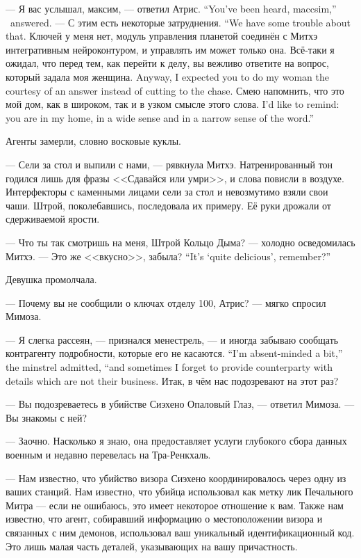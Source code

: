 {--- Я вас услышал, максим, --- ответил Атрис.}
{``You've been heard, maccsim,'' \Aatris\ answered.}
{--- С этим есть некоторые затруднения.}
{``We have some trouble about that.}
Ключей у меня нет, модуль управления планетой соединён с Митхэ интегративным нейроконтуром, и управлять им может только она.
{Всё-таки я ожидал, что перед тем, как перейти к делу, вы вежливо ответите на вопрос, который задала моя женщина.}
{Anyway, I expected you to do my woman the courtesy of an answer instead of cutting to the chase.}
{Смею напомнить, что это мой дом, как в широком, так и в узком смысле этого слова.}
{I'd like to remind: you are in my home, in a wide sense and in a narrow sense of the word.''}

Агенты замерли, словно восковые куклы.

--- Сели за стол и выпили с нами, --- рявкнула Митхэ.
Натренированный тон годился лишь для фразы <<Сдавайся или умри>>, и слова повисли в воздухе.
Интерфекторы с каменными лицами сели за стол и невозмутимо взяли свои чаши.
Штрой, поколебавшись, последовала их примеру.
Её руки дрожали от сдерживаемой ярости.

--- Что ты так смотришь на меня, Штрой Кольцо Дыма? --- холодно осведомилась Митхэ.
{--- Это же <<вкусно>>, забыла?}
{``It's `quite delicious', remember?''}

Девушка промолчала.

--- Почему вы не сообщили о ключах отделу 100, Атрис? --- мягко спросил Мимоза.

{--- Я слегка рассеян, --- признался менестрель, --- и иногда забываю сообщать контрагенту подробности, которые его не касаются.}
{``I'm absent-minded a bit,'' the minstrel admitted, ``and sometimes I forget to provide counterparty with details which are not their business.}
Итак, в чём нас подозревают на этот раз?

--- Вы подозреваетесь в убийстве Сиэхено Опаловый Глаз, --- ответил Мимоза.
--- Вы знакомы с ней?

--- Заочно.
Насколько я знаю, она предоставляет услуги глубокого сбора данных военным и недавно перевелась на Тра-Ренкхаль.

--- Нам известно, что убийство визора Сиэхено координировалось через одну из ваших станций.
Нам известно, что убийца использовал как метку лик Печального Митра --- если не ошибаюсь, это имеет некоторое отношение к вам.
Также нам известно, что агент, собиравший информацию о местоположении визора и связанных с ним демонов, использовал ваш уникальный идентификационный код.
Это лишь малая часть деталей, указывающих на вашу причастность.

